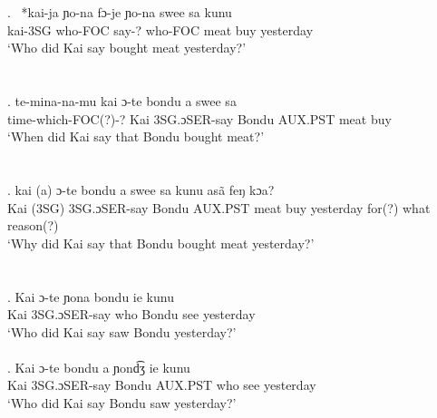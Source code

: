 \documentclass{assets/fieldnotes}
\begin{document}
\exg. \ *kai-ja ɲo-na fɔ-je ɲo-na swee sa kunu\\
kai-3SG who-FOC say-? who-FOC meat buy yesterday\\
`Who did Kai say bought meat yesterday?'\\ 

\\


\\
\exg. te-mina-na-mu kai ɔ-te bondu a swee sa\\
time-which-FOC(?)-? Kai 3SG.ɔSER-say Bondu AUX.PST meat buy\\
`When did Kai say that Bondu bought meat?'\\ 

\\

\\
\exg. kai (a) ɔ-te bondu a swee sa kunu asã feŋ kɔa?\\
Kai (3SG) 3SG.ɔSER-say Bondu AUX.PST meat buy yesterday for(?) what reason(?)\\
`Why did Kai say that Bondu bought meat yesterday?'\\ 

\\

\\
\exg. Kai ɔ-te ɲona bondu ie kunu\\
Kai 3SG.ɔSER-say who Bondu see yesterday\\
`Who did Kai say saw Bondu yesterday?'\\ 


\\
\exg. Kai ɔ-te bondu a ɲond͡ʒ ie kunu\\
Kai 3SG.ɔSER-say Bondu AUX.PST who see yesterday\\
`Who did Kai say Bondu saw yesterday?'\\ 

\\
\end{document}
